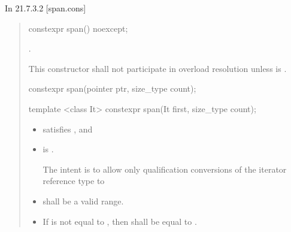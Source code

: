 \documentclass{wg21}
\begin{document}
In 21.7.3.2 [span.cons]

\begin{quote}


\begin{itemdecl}
    constexpr span() noexcept;
\end{itemdecl}
\begin{itemdescr}
    \pnum
    \ensures
    .

    \pnum
    \remarks
    This constructor shall not participate in overload resolution
    unless  is .
\end{itemdescr}
\begin{removedblock}
\begin{itemdecl}
constexpr span(pointer ptr, size_type count);
\end{itemdecl}
\end{removedblock}
\begin{addedblock}
\begin{itemdecl}
template <class It>
constexpr span(It first, size_type count);
\end{itemdecl}
\end{addedblock}
\begin{itemdescr}
    \begin{addedblock}
    \pnum
    \constraints
    \begin{itemize}
    	\item {} satisfies , and
    	\item {} is .
    	 \begin{note}The intent is to allow only qualification conversions of the iterator reference type to  \end{note}
    \end{itemize}
    \end{addedblock}

    \expects
\begin{itemize}
    \item {} shall be a valid range.
    \item If  is not equal to ,
    then  shall be equal to .
\end{itemize}
    


\end{itemdescr}
\end{quote}
\end{document}
